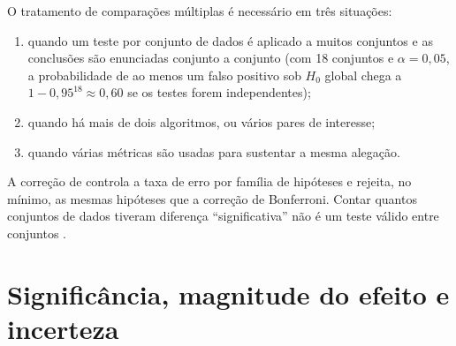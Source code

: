\documentclass[11pt,a4paper]{article}
\begin{document}
O tratamento de comparações múltiplas é necessário em três situações:
\begin{enumerate}[leftmargin=*]
  \item quando um teste por conjunto de dados é aplicado a muitos conjuntos e
    as conclusões são enunciadas conjunto a conjunto (com 18 conjuntos e
    $\alpha=0{,}05$, a probabilidade de ao menos um falso positivo sob $H_0$
    global chega a $1-0{,}95^{18}\approx0{,}60$ se os testes forem
    independentes);
  \item quando há mais de dois algoritmos, ou vários pares de interesse;
  \item quando várias métricas são usadas para sustentar a mesma alegação.
\end{enumerate}
A correção de \citet{holm1979simple} controla a taxa de erro por família de
hipóteses e rejeita, no mínimo, as mesmas hipóteses que a correção de
Bonferroni. Contar quantos
conjuntos de dados tiveram diferença ``significativa'' não é um teste válido
entre conjuntos \citep{demsar2006statistical}.

\section{Significância, magnitude do efeito e incerteza}\label{sec:efeito}
\end{document}
